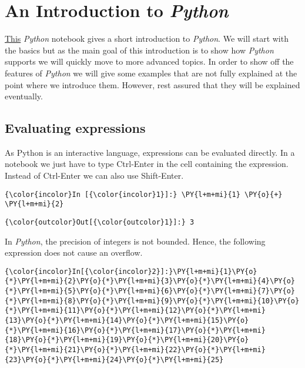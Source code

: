 \section{\texorpdfstring{An Introduction to
\textsl{Python}}{An Introduction to Python}}\label{an-introduction-to-python}
\href{https://github.com/karlstroetmann/Logic/blob/master/Python/Introduction.ipynb}{This} \textsl{Python} notebook gives a short introduction to \textsl{Python}.
We will start with the basics but as the main goal of this introduction
is to show how \textsl{Python} supports  we will quickly move
to more advanced topics. In order to show off the features of
\textsl{Python} we will give some examples that are not fully explained at
the point where we introduce them. However, rest assured that they will
be explained eventually.

\subsection{Evaluating expressions}\label{evaluating-expressions}
As Python is an interactive language, expressions can be evaluated
directly. In a  notebook we just have to type Ctrl-Enter
in the cell containing the expression. Instead of Ctrl-Enter we can also
use Shift-Enter.

\begin{Verbatim}[commandchars=\\\{\}]
{\color{incolor}In [{\color{incolor}1}]:} \PY{l+m+mi}{1} \PY{o}{+} \PY{l+m+mi}{2}
\end{Verbatim}

\begin{Verbatim}[commandchars=\\\{\}]
{\color{outcolor}Out[{\color{outcolor}1}]:} 3
\end{Verbatim}
            
In \textsl{Python}, the precision of integers is not bounded. Hence, the
following expression does not cause an overflow.

    \begin{Verbatim}[commandchars=\\\{\}]
{\color{incolor}In[{\color{incolor}2}]:}\PY{l+m+mi}{1}\PY{o}{*}\PY{l+m+mi}{2}\PY{o}{*}\PY{l+m+mi}{3}\PY{o}{*}\PY{l+m+mi}{4}\PY{o}{*}\PY{l+m+mi}{5}\PY{o}{*}\PY{l+m+mi}{6}\PY{o}{*}\PY{l+m+mi}{7}\PY{o}{*}\PY{l+m+mi}{8}\PY{o}{*}\PY{l+m+mi}{9}\PY{o}{*}\PY{l+m+mi}{10}\PY{o}{*}\PY{l+m+mi}{11}\PY{o}{*}\PY{l+m+mi}{12}\PY{o}{*}\PY{l+m+mi}{13}\PY{o}{*}\PY{l+m+mi}{14}\PY{o}{*}\PY{l+m+mi}{15}\PY{o}{*}\PY{l+m+mi}{16}\PY{o}{*}\PY{l+m+mi}{17}\PY{o}{*}\PY{l+m+mi}{18}\PY{o}{*}\PY{l+m+mi}{19}\PY{o}{*}\PY{l+m+mi}{20}\PY{o}{*}\PY{l+m+mi}{21}\PY{o}{*}\PY{l+m+mi}{22}\PY{o}{*}\PY{l+m+mi}{23}\PY{o}{*}\PY{l+m+mi}{24}\PY{o}{*}\PY{l+m+mi}{25}
\end{Verbatim}


